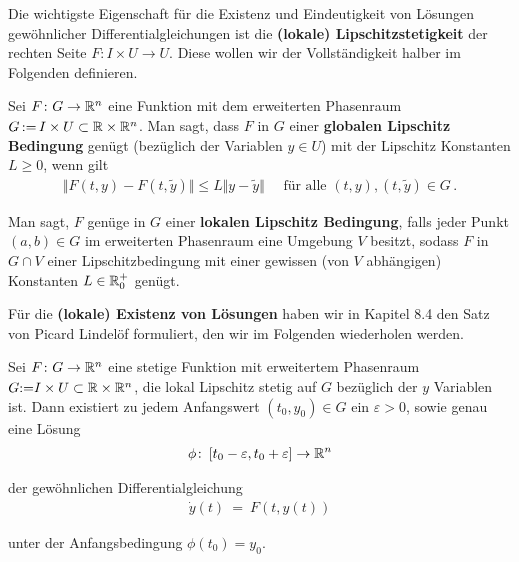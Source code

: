 \par
Die wichtigste Eigenschaft für die Existenz und Eindeutigkeit von Lösungen gewöhnlicher Differentialgleichungen ist die \textbf{(lokale) Lipschitzstetigkeit} der rechten Seite \(F \colon I \times U \rightarrow U\).
Diese wollen wir der Vollständigkeit halber im Folgenden definieren.
\label{ode/repetition:definition-8}
\begin{definition}{}{}



\par
Sei \(F \colon G \to \mathbb{R}^n\) eine Funktion mit dem erweiterten Phasenraum \(G \, {:=} \, I \times U \subset \mathbb{R}\times\mathbb{R}^n\).
Man sagt, dass \(F\) in \(G\) einer \textbf{globalen Lipschitz Bedingung} genügt (bezüglich der Variablen \(y \in U\)) mit der Lipschitz Konstanten \(L\geq0\), wenn gilt
\begin{align*}
\Vert F(t,y) - F(t,\widetilde{y}) \Vert \leq L \Vert y-\widetilde{y}\Vert\quad\text{ für alle }(t,y), (t,\widetilde{y})\in G\,.
\end{align*}
\par
Man sagt, \(F\) genüge in \(G\) einer \textbf{lokalen Lipschitz Bedingung}, falls jeder Punkt \((a,b)\in G\) im erweiterten Phasenraum eine Umgebung \(V\) besitzt, sodass \(F\) in \(G\cap V\) einer Lipschitzbedingung mit einer gewissen (von \(V\) abhängigen) Konstanten \(L\in\mathbb{R}_0^+\) genügt.
\end{definition}

\par
Für die \textbf{(lokale) Existenz von Lösungen} haben wir in Kapitel 8.4 \cite{Ten21} den Satz von Picard Lindelöf formuliert, den wir im Folgenden wiederholen werden.
\label{ode/repetition:satz:picardlindeloef_lokal}
\begin{theorem}{}{}



\par
Sei \(F\colon G\to\mathbb{R}^n\) eine stetige Funktion mit erweitertem Phasenraum \(G {:=} I \times U \subset \mathbb{R}\times\mathbb{R}^n\), die lokal Lipschitz stetig auf \(G\) bezüglich der \(y\) Variablen ist.
Dann existiert zu jedem Anfangswert \((t_0,y_0) \in G\) ein \(\varepsilon>0\), sowie genau eine Lösung
\begin{align*}
\phi \colon \left[t_0-\varepsilon, t_0+\varepsilon\right] \to \mathbb{R}^n
\end{align*}
\par
der gewöhnlichen Differentialgleichung
\begin{align*}
\dot{y}(t) \ = \ F(t,y(t))
\end{align*}
\par
unter der Anfangsbedingung \(\phi(t_0)=y_0\).
\end{theorem}

